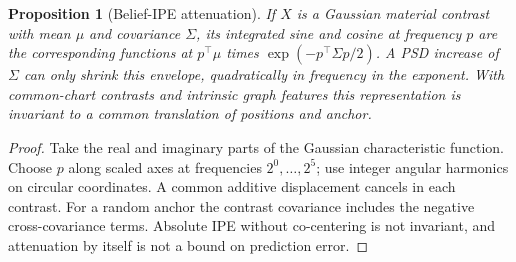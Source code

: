 \documentclass[11pt]{article}
\newtheorem{proposition}[theorem]{Proposition}
\begin{document}
\begin{proposition}[Belief-IPE attenuation]\label{prop:ipe}
If $X$ is a Gaussian material contrast with mean $\mu$ and covariance
$\Sigma$, its integrated sine and cosine at frequency $p$ are the
corresponding functions at $p^\top\mu$ times $\exp(-p^\top\Sigma p/2)$.
A PSD increase of $\Sigma$ can only shrink this envelope, quadratically in
frequency in the exponent. With common-chart contrasts and intrinsic graph
features this representation is invariant to a common translation of
positions and anchor.
\end{proposition}
\begin{proof}
Take the real and imaginary parts of the Gaussian characteristic function.
Choose $p$ along scaled axes at frequencies $2^0,\ldots,2^5$; use integer
angular harmonics on circular coordinates. A common additive displacement
cancels in each contrast. For a random anchor the contrast covariance
includes the negative cross-covariance terms. Absolute IPE without
co-centering is not invariant, and attenuation by itself is not a bound on
prediction error.
\end{proof}
\end{document}
